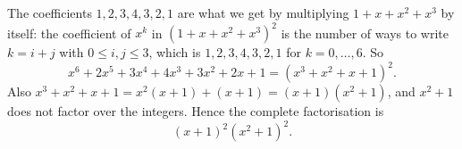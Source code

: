 The coefficients $1,2,3,4,3,2,1$ are what we get by multiplying $1+x+x^2+x^3$ by itself: the coefficient of $x^k$ in $(1+x+x^2+x^3)^2$ is the number of ways to write $k=i+j$ with $0\le i,j\le3$, which is $1,2,3,4,3,2,1$ for $k=0,\dots,6$. So
\[
x^6+2x^5+3x^4+4x^3+3x^2+2x+1=\left(x^3+x^2+x+1\right)^2 .
\]
Also $x^3+x^2+x+1=x^2(x+1)+(x+1)=(x+1)(x^2+1)$, and $x^2+1$ does not factor over the integers. Hence the complete factorisation is
\[
\boxed{(x+1)^2\left(x^2+1\right)^2}.
\]
